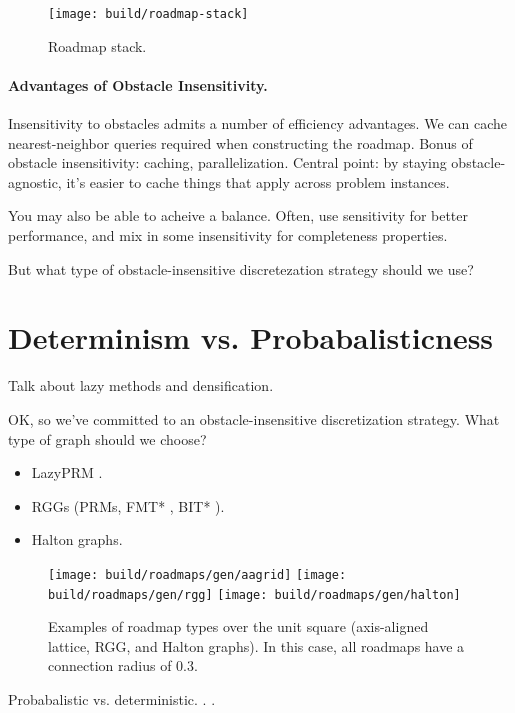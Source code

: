 \begin{figure}
   \centering
   \texttt{[image: build/roadmap-stack]}
   \caption{Roadmap stack.}
\end{figure}

\paragraph{Advantages of Obstacle Insensitivity.}
Insensitivity to obstacles admits a number of efficiency advantages.
We can cache nearest-neighbor queries required when constructing
the roadmap.
Bonus of obstacle insensitivity: caching, parallelization.
Central point: by staying obstacle-agnostic, it's easier to cache
things that apply across problem instances.

You may also be able to acheive a balance.
Often, use sensitivity for better performance,
and mix in some insensitivity for completeness properties.

But what type of obstacle-insensitive discretezation strategy should
we use?

\section{Determinism vs. Probabalisticness}

Talk about lazy methods and densification.

OK, so we've committed to an obstacle-insensitive discretization
strategy.
What type of graph should we choose?

\begin{itemize}
\item LazyPRM \citep{bohlin2000lazyprm}.
\item RGGs (PRMs, FMT* \citep{janson2015fmtstar},
   BIT* \citep{gammell2015bitstar}).
\item Halton graphs.
\end{itemize}


\begin{figure}
   \centering
   \texttt{[image: build/roadmaps/gen/aagrid]}
   \texttt{[image: build/roadmaps/gen/rgg]}
   \texttt{[image: build/roadmaps/gen/halton]}
   \caption{Examples of roadmap types over the unit square
      (axis-aligned lattice, RGG, and Halton graphs).
      In this case, all roadmaps have a connection radius of 0.3.}
\end{figure}

Probabalistic vs. deterministic.
\citep{branicky2002detvsprobroadmaps}.
\citep{lavalle2002gridprms}.

